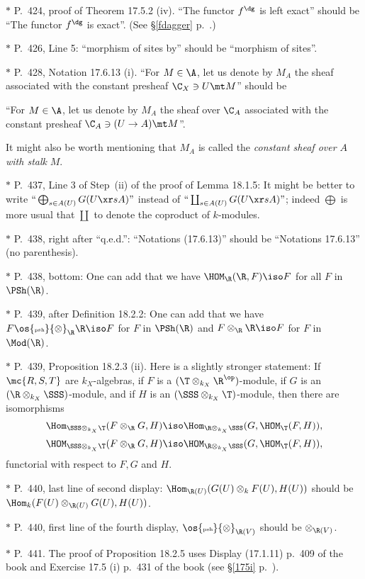 \documentclass[12pt]{article}
\theoremstyle{remark}
\theoremstyle{definition}
\begin{document}
\nn$*$ P.~424, proof of Theorem 17.5.2 (iv). ``The functor $f^\dg$ is left exact'' should be ``The functor $f^\dg$ is exact''. (See \S\ref{fdagger} p.~.) 

\nn$*$ P.~426, Line 5: ``morphism of sites by'' should be ``morphism of sites''.

\nn$*$ P.~428, Notation 17.6.13 (i). ``For $M\in\A$, let us denote by $M_A$ the sheaf associated with the constant presheaf $\C_X\ni U\mt M$'' should be  

``For $M\in\A$, let us denote by $M_A$ the sheaf over $\C_A$ associated with the constant presheaf $\C_A\ni(U\to A)\mt M$''. 

It might also be worth mentioning that $M_A$ is called the \emph{constant sheaf over $A$ with stalk} $M$. 

\nn$*$ P.~437, Line 3 of Step~(ii) of the proof of Lemma 18.1.5: It might be better to write $``\bigoplus_{s\in A(U)}G(U\xr sA)"$ instead of $``\coprod_{s\in A(U)}G(U\xr sA)"$; indeed $\bigoplus$ is more usual that $\coprod$ to denote the coproduct of $k$-modules. 

\nn$*$ P.~438, right after ``q.e.d.'': ``Notations (17.6.13)'' should be ``Notations 17.6.13'' (no parenthesis). 

\nn$*$ P.~438, bottom: One can add that we have $\HOM_\R(\R,F)\iso F$ for all $F$ in $\PSh(\R)$. 

\nn$*$ P.~439, after Definition 18.2.2: One can add that we have $F\os{\text{\tiny psh}}{\otimes}_\R\R\iso F$ for $F$ in $\PSh(\R)$ and $F\otimes_\R\R\iso F$ for $F$ in $\Mod(\R)$. 

\nn$*$ P.~439, Proposition 18.2.3 (ii). Here is a slightly stronger statement: If $\mc{R,S,T}$ are $k_X$-algebras, if $F$ is a $(\T\otimes_{k_X}\R^{\op})$-module, if $G$ is an $(\R\otimes_{k_X}\SSS)$-module, and if $H$ is an $(\SSS\otimes_{k_X}\T)$-module, then there are isomorphisms 
$$
\Hom_{\SSS\otimes_{k_X}\T}(F\otimes_\R G,H)\iso
\Hom_{\R\otimes_{k_X}\SSS}(G,\HOM_\T(F,H)), 
$$ 
$$
\HOM_{\SSS\otimes_{k_X}\T}(F\otimes_\R G,H)\iso
\HOM_{\R\otimes_{k_X}\SSS}(G,\HOM_\T(F,H)), 
$$ 
functorial with respect to $F,G$ and $H$.

\nn$*$ P.~440, last line of second display: $\Hom_{\R(U)}(G(U)\otimes_kF(U),H(U))$ should be $\Hom_k(F(U)\otimes_{\R(U)}G(U),H(U))$. 

\nn$*$ P.~440, first line of the fourth display, $\os{\text{\tiny psh}}{\otimes}_{\R(V)}$ should be $\otimes_{\R(V)}$. 

\nn$*$ P.~441. The proof of Proposition 18.2.5 uses Display (17.1.11) p.~409 of the book and Exercise 17.5 (i) p.~431 of the book (see \S\ref{175i} p.~).  
\end{document}
